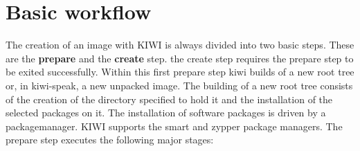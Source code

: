 \chapter{Basic workflow}
\label{chapter:workflow}
\minitoc

The creation of an image with KIWI is always divided into two
basic steps. These are the \textbf{prepare} and the \textbf{create}
step. the create step requires the prepare step to be exited
successfully. Within this first prepare step kiwi builds of a new root
tree or, in kiwi-speak, a new unpacked image. The building of a new
root tree consists of the creation of the directory specified to
hold it and the installation of the selected packages on it. The
installation of software packages is driven by a packagemanager.
KIWI supports the smart and zypper package managers. The prepare
step executes the following major stages:

